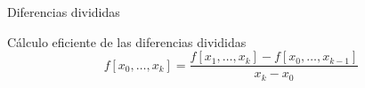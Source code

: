 \begin{frame}{Diferencias divididas}
  \begin{exampleblock}{Cálculo eficiente de las diferencias divididas}
    \[
      f[x_0, \dots, x_k] = 
      \frac{f[x_1, \dots, x_k] - f[x_0, \dots, x_{k - 1}]}{x_k - x_0}
    \]
  \end{exampleblock}

\end{frame}
